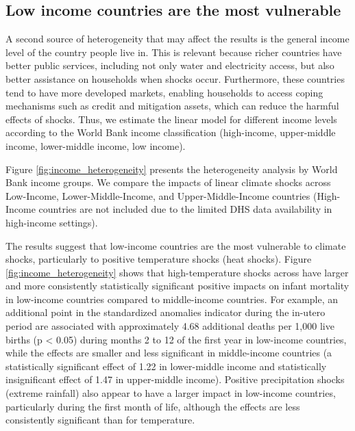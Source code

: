 \documentclass[a4paper]{article}
\begin{document}
\subsection{Low income countries are the most vulnerable}

A second source of heterogeneity that may affect the results is the general income level of the country people live in. This is relevant because richer countries have better public services, including not only water and electricity access, but also better assistance on households when shocks occur. Furthermore, these countries tend to have more developed markets, enabling households to access coping mechanisms such as credit and mitigation assets, which can reduce the harmful effects of shocks. Thus, we estimate the linear model for different income levels according to the World Bank income classification (high-income, upper-middle income, lower-middle income, low income).

Figure \ref{fig:income_heterogeneity} presents the heterogeneity analysis by World Bank income groups.  We compare the impacts of linear climate shocks across Low-Income, Lower-Middle-Income, and Upper-Middle-Income countries (High-Income countries are not included due to the limited DHS data availability in high-income settings).

The results suggest that low-income countries are the most vulnerable to climate shocks, particularly to positive temperature shocks (heat shocks).  Figure \ref{fig:income_heterogeneity} shows that high-temperature shocks across have larger and more consistently statistically significant positive impacts on infant mortality in low-income countries compared to middle-income countries.  For example, an additional point in the standardized anomalies indicator during the in-utero period are associated with approximately 4.68 additional deaths per 1,000 live births (p < 0.05) during months 2 to 12 of the first year in low-income countries, while the effects are smaller and less significant in middle-income countries (a statistically significant effect of 1.22 in lower-middle income and statistically insignificant effect of 1.47 in upper-middle income).  Positive precipitation shocks (extreme rainfall) also appear to have a larger impact in low-income countries, particularly during the first month of life, although the effects are less consistently significant than for temperature.
\end{document}
